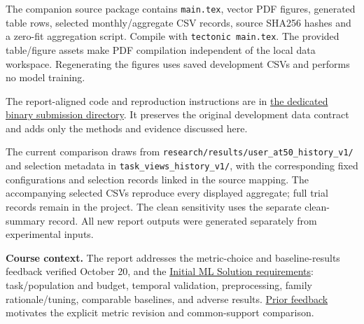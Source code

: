 \documentclass[11pt,letterpaper]{article}
\newcommand{\sect}[1]{\vspace{4pt}{\large\bfseries\color{teal}#1}\par}
\begin{document}
\sect{Reproducibility and evidence}
The companion source package contains \texttt{main.tex}, vector PDF figures, generated table rows, selected monthly/aggregate CSV records, source SHA256 hashes and a zero-fit aggregation script. Compile with \texttt{tectonic main.tex}. The provided table/figure assets make PDF compilation independent of the local data workspace. Regenerating the figures uses saved development CSVs and performs no model training.

The report-aligned code and reproduction instructions are in \href{https://github.com/Lyleeeeeeee/10718_MLinPractice/tree/main/wikiflow/binary}{the dedicated binary submission directory}. It preserves the original development data contract and adds only the methods and evidence discussed here.

The current comparison draws from \texttt{research/results/user\_at50\_history\_v1/} and selection metadata in \texttt{task\_views\_history\_v1/}, with the corresponding fixed configurations and selection records linked in the source mapping. The accompanying selected CSVs reproduce every displayed aggregate; full trial records remain in the project. The clean sensitivity uses the separate clean-summary record. All new report outputs were generated separately from experimental inputs.

\textbf{Course context.} The report addresses the metric-choice and baseline-results feedback verified October 20, and the \href{https://canvas.cmu.edu/courses/56403/assignments/1023752}{Initial ML Solution requirements}: task/population and budget, temporal validation, preprocessing, family rationale/tuning, comparable baselines, and adverse results. \href{https://docs.google.com/spreadsheets/d/1QIaExyCzQZRZ8s9_8-jXQsVivJHy3t5D_VwVCl5kEWs/edit#gid=1437791232}{Prior feedback} motivates the explicit metric revision and common-support comparison.
\end{document}

